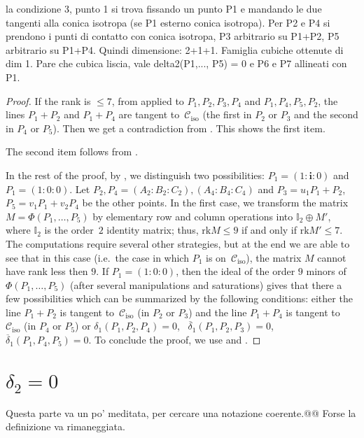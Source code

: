 \documentclass[11pt, a4paper, reqno, captions=tableheading,bibliography=totoc]{scrartcl}
\theoremstyle{plain}
\theoremstyle{definition}
\newcommand{\iso}{\mathcal{C}_{\mathrm{iso}}}
\newcommand{\iii}{\textbf{i}}
\newcommand{\rk}{\ensuremath{\mathrm{rk}}}
\begin{document}
la condizione 3, punto 1 si trova fissando un punto P1 e mandando le due
tangenti alla conica isotropa (se P1 esterno conica isotropa). Per P2 e P4 si prendono i punti di contatto con conica isotropa, P3 arbitrario su P1+P2, P5 arbitrario su P1+P4. Quindi dimensione: 2+1+1. Famiglia cubiche ottenute di dim 1. Pare che cubica liscia, vale delta2(P1,..., P5) = 0 e P6 e P7 allineati con P1.   
\begin{proof}
If the rank is $\leq 7$, from
 applied to $P_1, P_2, P_3, P_4$ and $P_1, P_4, P_5, P_2$,
the lines $P_1+P_2$ and $P_1 + P_4$ are tangent to~$\iso$ (the first in $P_2$ or $P_3$ and the second in $P_4$ or $P_5$).
Then we get a contradiction from .
This shows the first item.

The second item follows from .

In the rest of the proof, by , we distinguish two possibilities:
$P_1 = (1:\iii :0)$ and
$P_1 = (1: 0: 0)$.
Let $P_2, P_4 = (A_2: B_2: C_2), (A_4: B_4: C_4)$ and
$P_3 = u_1P_1+P_2$, $P_5 = v_1P_1+v_2P_4$ be the other points.
In the first case, we transform the matrix $M = \Phi(P_1, \dots, P_5)$ by elementary row and column operations into $\mathbb{I}_2 \oplus M'$, where $\mathbb{I}_2$ is the order~$2$ identity matrix; thus, $\rk  M \leq 9$ if and only if $\rk  M' \leq 7$.
The computations require several other strategies, but at the end we are
able to see that in this case (i.e.\ the case in which $P_1$ is on~$\iso$), the matrix $M$ cannot have rank less then $9$.
If $P_1 = (1: 0: 0)$, then the ideal of the order $9$ minors of
$\Phi(P_1, \dots, P_5)$ (after several manipulations and saturations)
gives that there a few possibilities which can be summarized by the
following conditions: either the line $P_1+P_2$ is tangent to~$\iso$ (in $P_2$ or $P_3$) and the line $P_1+P_4$ is tangent to~$\iso$ (in $P_4$ or $P_5$) or $\delta_1(P_1, P_2, P_4) = 0$,
\ $\overline{\delta}_1(P_1, P_2, P_3) = 0$,
\ $\overline{\delta}_1(P_1, P_4, P_5) = 0$.
To conclude the proof, we use  and .
\end{proof}

\section{$\delta_2=0$}
\label{sezione_delta_2}

Questa parte va un po' meditata, per cercare una notazione coerente.@@
Forse la definizione  va rimaneggiata.
\end{document}
